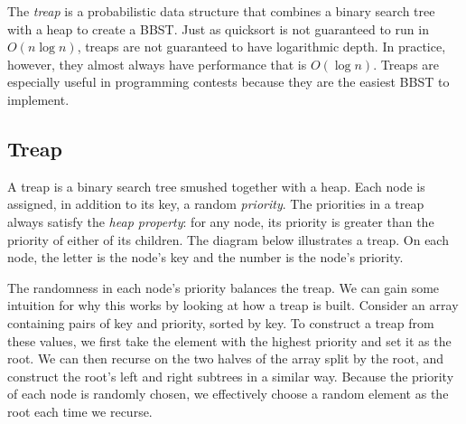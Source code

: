 The \textit{treap} is a probabilistic data structure that combines a binary search tree with a heap to create a BBST. Just as quicksort is not guaranteed to run in $O(n\log{n})$, treaps are not guaranteed to have logarithmic depth. In practice, however, they almost always have performance that is $O(\log n)$. Treaps are especially useful in programming contests because they are the easiest BBST to implement. 

\subsection{Treap}

A treap is a binary search tree smushed together with a heap. Each node is assigned, in addition to its key, a random \emph{priority}. The priorities in a treap always satisfy the \emph{heap property}: for any node, its priority is greater than the priority of either of its children. The diagram below illustrates a treap. On each node, the letter is the node's key and the number is the node's priority.

\begin{center}
\end{center}

The randomness in each node's priority balances the treap. We can gain some intuition for why this works by looking at how a treap is built. Consider an array containing pairs of key and priority, sorted by key. To construct a treap from these values, we first take the element with the highest priority and set it as the root. We can then recurse on the two halves of the array split by the root, and construct the root's left and right subtrees in a similar way. Because the priority of each node is randomly chosen, we effectively choose a random element as the root each time we recurse.

